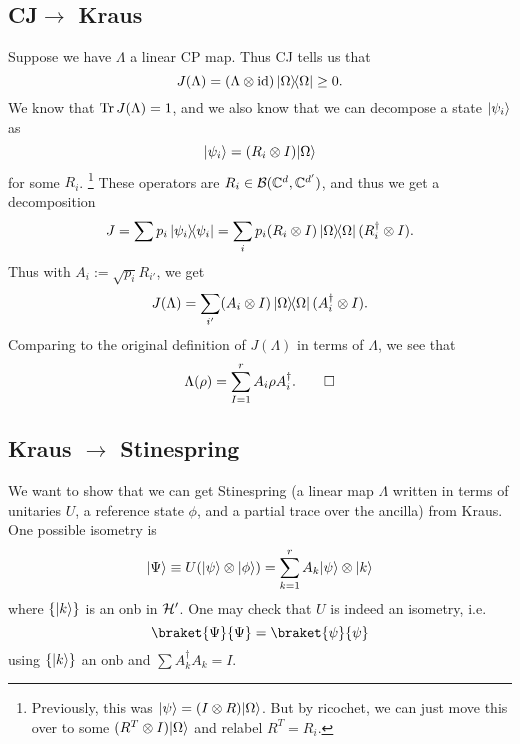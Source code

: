 \subsection*{CJ$\to$ Kraus}
Suppose we have $\Lambda$ a linear CP map. Thus CJ tells us that
\begin{equation*}
    J(\Lambda)=(\Lambda\otimes \operatorname{id})\left\lvert \Omega \middle\rangle\!\middle\langle \Omega \right\rvert \geq 0.
\end{equation*}
We know that $\operatorname{Tr} J(\Lambda)=1$, and we also know that we can decompose a state $\lvert\psi_i\rangle$ as
\begin{equation}
    \lvert\psi_i\rangle=(R_i\otimes I)\lvert\Omega\rangle
\end{equation}
for some $R_i$.%
    \footnote{Previously, this was $\lvert\psi\rangle=(I\otimes R)\lvert\Omega\rangle$. But by ricochet, we can just move this over to some $(R^T \otimes I)\lvert\Omega\rangle$ and relabel $R^T=R_i.$}
These operators are $R_i\in \mathcal{B}(\mathbb{C}^d,\mathbb{C}^{d'})$, and thus we get a decomposition
\begin{equation}
    J=\sum p_i \left\lvert \psi_i \middle\rangle\!\middle\langle \psi_i \right\rvert = \sum_i p_i (R_i\otimes I)\left\lvert \Omega \middle\rangle\!\middle\langle \Omega \right\rvert (R_i^\dagger \otimes I).
\end{equation}
Thus with $A_i := \sqrt{p_i}R_{i'}$, we get
\begin{equation}
    J(\Lambda) = \sum_{i'} (A_i \otimes I)\left\lvert \Omega \middle\rangle\!\middle\langle \Omega \right\rvert (A^\dagger_i \otimes I).
\end{equation}
Comparing to the original definition of $J(\Lambda)$ in terms of $\Lambda$, we see that
\begin{equation}
    \Lambda(\rho)=\sum_{I=1}^r A_i \rho A_i^\dagger.\qed
\end{equation}

\subsection*{Kraus $\to$ Stinespring}
We want to show that we can get Stinespring (a linear map $\Lambda$ written in terms of unitaries $U$, a reference state $\phi$, and a partial trace over the ancilla) from Kraus. One possible isometry is
\begin{equation}
    \lvert\Psi\rangle \equiv U(\lvert\psi\rangle\otimes \lvert\phi\rangle) = \sum_{k=1}^r A_k \lvert\psi\rangle\otimes \lvert k\rangle
\end{equation}
where $\{\lvert k\rangle\}$ is an onb in $\mathcal H'$. One may check that $U$ is indeed an isometry, i.e.
\begin{equation}
    \braket{\Psi}{\Psi}=\braket{\psi}{\psi}
\end{equation}
using $\{\lvert k\rangle\}$ an onb and $\sum A_k^\dagger A_k=I$.

